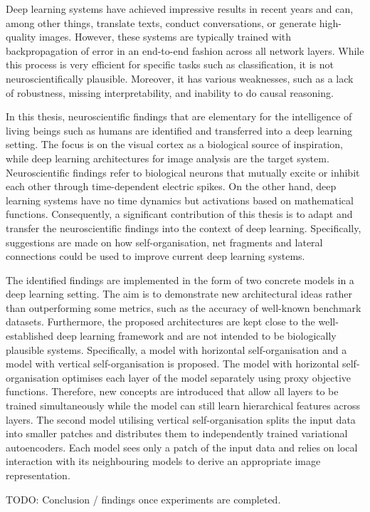Deep learning systems have achieved impressive results in recent years and can, among other things, translate texts, conduct conversations, or generate high-quality images. However, these systems are typically trained with backpropagation of error in an end-to-end fashion across all network layers. While this process is very efficient for specific tasks such as classification, it is not neuroscientifically plausible. Moreover, it has various weaknesses, such as a lack of robustness, missing interpretability, and inability to do causal reasoning.

In this thesis, neuroscientific findings that are elementary for the intelligence of living beings such as humans are identified and transferred into a deep learning setting. The focus is on the visual cortex as a biological source of inspiration, while deep learning architectures for image analysis are the target system. Neuroscientific findings refer to biological neurons that mutually excite or inhibit each other through time-dependent electric spikes. On the other hand, deep learning systems have no time dynamics but activations based on mathematical functions. Consequently, a significant contribution of this thesis is to adapt and transfer the neuroscientific findings into the context of deep learning. Specifically, suggestions are made on how self-organisation, net fragments and lateral connections could be used to improve current deep learning systems.

The identified findings are implemented in the form of two concrete models in a deep learning setting. The aim is to demonstrate new architectural ideas rather than outperforming some metrics, such as the accuracy of well-known benchmark datasets. Furthermore, the proposed architectures are kept close to the well-established deep learning framework and are not intended to be biologically plausible systems. Specifically, a model with horizontal self-organisation and a model with vertical self-organisation is proposed. The model with horizontal self-organisation optimises each layer of the model separately using proxy objective functions. Therefore, new concepts are introduced that allow all layers to be trained simultaneously while the model can still learn hierarchical features across layers. The second model utilising vertical self-organisation splits the input data into smaller patches and distributes them to independently trained variational autoencoders. Each model sees only a patch of the input data and relies on local interaction with its neighbouring models to derive an appropriate image representation.

TODO: Conclusion / findings once experiments are completed.